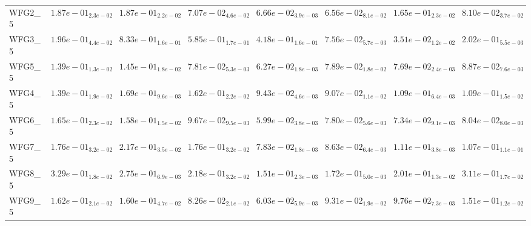 \documentclass{article}
\begin{document}
\begin{landscape}
\begin{table}
\begin{scriptsize}
\begin{tabular}{llllllll}
WFG2\_5 & $  1.87e-01_{ 2.3e-02}$ & $  1.87e-01_{ 2.2e-02}$ & $  7.07e-02_{ 4.6e-02}$ & \cellcolor{gray25}$  6.66e-02_{ 3.9e-03}$ & \cellcolor{gray95}$  6.56e-02_{ 8.1e-02}$ & $  1.65e-01_{ 2.3e-02}$ & $  8.10e-02_{ 3.7e-02}$ \\
WFG3\_5 & $  1.96e-01_{ 4.4e-02}$ & $  8.33e-01_{ 1.6e-01}$ & $  5.85e-01_{ 1.7e-01}$ & $  4.18e-01_{ 1.6e-01}$ & \cellcolor{gray25}$  7.56e-02_{ 5.7e-03}$ & \cellcolor{gray95}$  3.51e-02_{ 1.2e-02}$ & $  2.02e-01_{ 5.5e-03}$ \\
WFG5\_5 & $  1.39e-01_{ 1.3e-02}$ & $  1.45e-01_{ 1.8e-02}$ & $  7.81e-02_{ 5.3e-03}$ & \cellcolor{gray95}$  6.27e-02_{ 1.8e-03}$ & $  7.89e-02_{ 1.8e-02}$ & \cellcolor{gray25}$  7.69e-02_{ 2.4e-03}$ & $  8.87e-02_{ 7.6e-03}$ \\
WFG4\_5 & $  1.39e-01_{ 1.9e-02}$ & $  1.69e-01_{ 9.6e-03}$ & $  1.62e-01_{ 2.2e-02}$ & \cellcolor{gray25}$  9.43e-02_{ 4.6e-03}$ & \cellcolor{gray95}$  9.07e-02_{ 1.1e-02}$ & $  1.09e-01_{ 6.4e-03}$ & $  1.09e-01_{ 1.5e-02}$ \\
WFG6\_5 & $  1.65e-01_{ 2.3e-02}$ & $  1.58e-01_{ 1.5e-02}$ & $  9.67e-02_{ 9.5e-03}$ & \cellcolor{gray95}$  5.99e-02_{ 3.8e-03}$ & $  7.80e-02_{ 5.6e-03}$ & \cellcolor{gray25}$  7.34e-02_{ 9.1e-03}$ & $  8.04e-02_{ 8.0e-03}$ \\
WFG7\_5 & $  1.76e-01_{ 3.2e-02}$ & $  2.17e-01_{ 3.5e-02}$ & $  1.76e-01_{ 3.2e-02}$ & \cellcolor{gray95}$  7.83e-02_{ 1.8e-03}$ & \cellcolor{gray25}$  8.63e-02_{ 6.4e-03}$ & $  1.11e-01_{ 3.8e-03}$ & $  1.07e-01_{ 1.1e-01}$ \\
WFG8\_5 & $  3.29e-01_{ 1.8e-02}$ & $  2.75e-01_{ 6.9e-03}$ & $  2.18e-01_{ 3.2e-02}$ & \cellcolor{gray95}$  1.51e-01_{ 2.3e-03}$ & \cellcolor{gray25}$  1.72e-01_{ 5.0e-03}$ & $  2.01e-01_{ 1.3e-02}$ & $  3.11e-01_{ 1.7e-02}$ \\
WFG9\_5 & $  1.62e-01_{ 2.1e-02}$ & $  1.60e-01_{ 4.7e-02}$ & \cellcolor{gray25}$  8.26e-02_{ 2.1e-02}$ & \cellcolor{gray95}$  6.03e-02_{ 5.9e-03}$ & $  9.31e-02_{ 1.9e-02}$ & $  9.76e-02_{ 7.3e-03}$ & $  1.51e-01_{ 1.2e-02}$ \\
\hline
\end{tabular}
\end{scriptsize}
\end{table}
\end{landscape}
\end{document}
